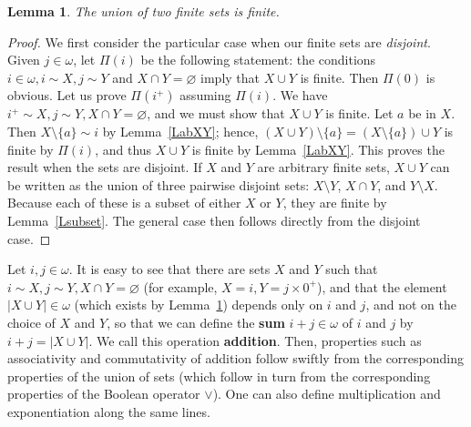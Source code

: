 \documentclass[12pt,letterpaper]{article}
\newtheorem{lem}[thm]{Lemma} %
\begin{document}
\begin{lem}\label{Lunion} 
The union of two finite sets is finite. 
\end{lem} 
\begin{proof} 
We first consider the particular case when our finite sets are \emph{disjoint}. Given \(j\in\omega\), let \(\Pi(i)\) be the following statement: the conditions \(i\in\omega,i\sim X,j\sim Y\) and \(X\cap Y=\varnothing\) imply that \(X\cup Y\) is finite. Then \(\Pi(0)\) is obvious. Let us prove \(\Pi(i^+)\) assuming \(\Pi(i)\). We have \(i^+\sim X,j\sim Y,X\cap Y=\varnothing\), and we must show that \(X\cup Y\) is finite. Let \(a\) be in \(X\). Then \(X\setminus\{a\}\sim i\) by Lemma~\ref{LabXY}; hence, \((X\cup Y)\setminus\{a\}=(X\setminus\{a\})\cup Y\) is finite by \(\Pi(i)\), and thus \(X\cup Y\) is finite by Lemma~\ref{LabXY}. This proves the result when the sets are disjoint. If \(X\) and \(Y\) are arbitrary finite sets, \(X \cup Y\) can be written as the union of three pairwise disjoint sets: \(X \setminus Y\), \(X \cap Y\), and \(Y\setminus X\). Because each of these is a subset of either \(X\) or \(Y\), they are finite by Lemma~\ref{Lsubset}. The general case then follows directly from the disjoint case. 
\end{proof} 

Let \(i,j\in\omega\). It is easy to see that there are sets \(X\) and \(Y\) such that \(i\sim X,j\sim Y, X\cap Y=\varnothing\) (for example, \(X=i,Y=j\times 0^+\)), and that the element \(|X\cup Y|\in\omega\) (which exists by Lemma~\ref{Lunion}) depends only on \(i\) and \(j\), and not on the choice of \(X\) and \(Y\), so that we can define the \textbf{sum} \(i+j\in\omega\) of \(i\) and \(j\) by \(i+j=|X\cup Y|\). We call this operation \textbf{addition}. Then, properties such as associativity and commutativity of addition follow swiftly from the corresponding properties of the union of sets (which follow in turn from the corresponding properties of the Boolean operator \(\lor\)). One can also define multiplication and exponentiation along the same lines. 

\printbibliography
\end{document}
